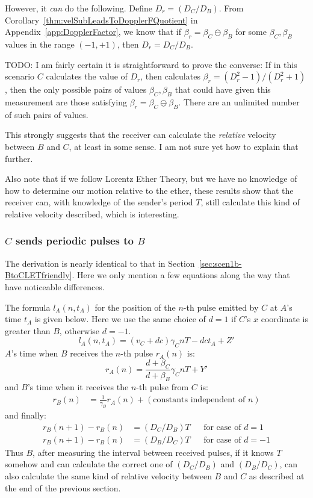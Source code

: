 \documentclass[a4paper]{article}
\theoremstyle{plain}
\theoremstyle{definition}
\begin{document}
However, it {\em can} do the following.  Define $D_r = (D_C / D_B)$.
From Corollary~\ref{thm:velSubLeadsToDopplerFQuotient} in
Appendix~\ref{app:DopplerFactor}, we know that if
$\beta_r = \beta_C \ominus \beta_B$ for some $\beta_C, \beta_B$ values
in the range $(-1, +1)$, then $D_r = D_C / D_B$.

TODO: I am fairly certain it is straightforward to prove the converse:
If in this scenario $C$ calculates the value of $D_r$, then
calculates $\beta_r = (D_r^2-1)/(D_r^2+1)$, then the only possible
pairs of values $\beta_C, \beta_B$ that could have given this
measurement are those satisfying $\beta_r = \beta_C \ominus \beta_B$.
There are an unlimited number of such pairs of values.

This strongly suggests that the receiver can calculate the
{\em relative} velocity between $B$ and $C$, at least in some sense.
I am not sure yet how to explain that further.

Also note that if we follow Lorentz Ether Theory, but we have no
knowledge of how to determine our motion relative to the ether, these
results show that the receiver can, with knowledge of the sender's
period $T$, still calculate this kind of relative velocity described,
which is interesting.


\subsubsection{$C$ sends periodic pulses to $B$}
\label{sec:scen1b-CtoBLETfriendly}

The derivation is nearly identical to that in
Section~\ref{sec:scen1b-BtoCLETfriendly}.
Here we only mention a few equations along the way that have
noticeable differences.

The formula $l_A(n,t_A)$ for the position of the $n$-th pulse emitted
by $C$ at $A$'s time $t_A$ is given below.
Here we use the same choice of $d=1$ if $C$'s $x$ coordinate is
greater than $B$, otherwise $d=-1$.
\begin{equation}
l_A(n, t_A) = (v_C + dc) \gamma_C nT - dc t_A + Z'
\end{equation}
$A$'s time when $B$ receives the $n$-th pulse $r_A(n)$ is:
\begin{equation}
r_A(n) = \frac{d + \beta_C}{d + \beta_B} \gamma_C nT + Y'
\end{equation}
and $B$'s time when it receives the $n$-th pulse from $C$ is:
\begin{align*}
r_B(n) & = \frac{1}{\gamma_B} r_A(n) + (\text{constants independent of $n$})
\end{align*}
and finally:
\begin{align*}
r_B(n+1) - r_B(n)
       & = ( D_C / D_B ) T & & \text{for case of $d=1$} \\
r_B(n+1) - r_B(n)
       & = ( D_B / D_C ) T & & \text{for case of $d=-1$}
\end{align*}
Thus $B$, after measuring the interval between received pulses, if it
knows $T$ somehow and can calculate the correct one of $(D_C / D_B)$
and $(D_B / D_C)$, can also calculate the same kind of relative
velocity between $B$ and $C$ as described at the end of the previous
section.
\end{document}

